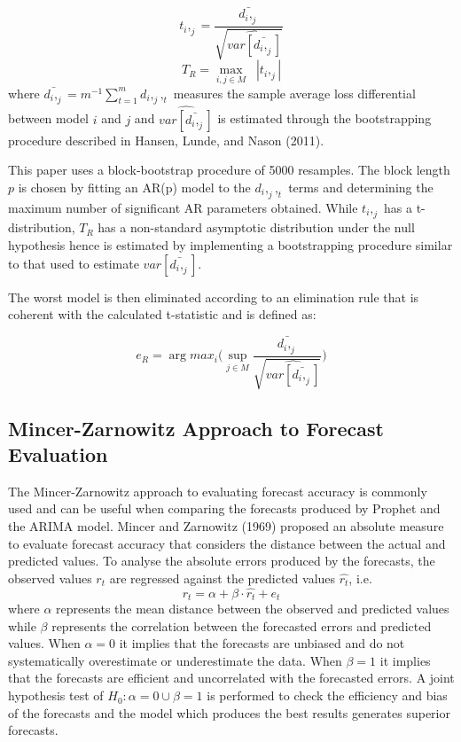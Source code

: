 \documentclass[12pt,a4paper]{article}
\numberwithin{equation}{section}
\numberwithin{figure}{section}
\numberwithin{table}{section}
\begin{document}
\[t_i,_j = \frac{\bar{d_i,_j}}{\sqrt{\hat{var[\bar{d_i,_j}]}}}\]
\vspace{1pt} \[ T_R = \max_{i,j\in M} \;\; |t_i,_j|\] where
\(\bar{d_i,_j} = m^{-1}\sum_{t=1}^{m}{d_i,_j,_t }\) measures the sample
average loss differential between model \(i\) and \(j\) and
\(\hat{var[\bar{d_i,_j}]}\) is estimated through the bootstrapping
procedure described in Hansen, Lunde, and Nason (2011).

This paper uses a block-bootstrap procedure of 5000 resamples. The block
length \(p\) is chosen by fitting an AR(p) model to the \(d_i,_j,_t\)
terms and determining the maximum number of significant AR parameters
obtained. While \(t_i,_j\) has a t-distribution, \(T_R\) has a
non-standard asymptotic distribution under the null hypothesis hence is
estimated by implementing a bootstrapping procedure similar to that used
to estimate \({var[\bar{d_i,_j}]}\).

The worst model is then eliminated according to an elimination rule that
is coherent with the calculated t-statistic and is defined as:

\[e_R = \arg max_{i}\bigg(\sup_{j\in M}\frac{\bar{d_i,_j}}{\sqrt{\hat{var[\bar{d_i,_j}]}}}\bigg)\]

\subsection{Mincer-Zarnowitz Approach to Forecast
Evaluation}\label{mincer-zarnowitz-approach-to-forecast-evaluation}

The Mincer-Zarnowitz approach to evaluating forecast accuracy is
commonly used and can be useful when comparing the forecasts produced by
Prophet and the ARIMA model. Mincer and Zarnowitz (1969) proposed an
absolute measure to evaluate forecast accuracy that considers the
distance between the actual and predicted values. To analyse the
absolute errors produced by the forecasts, the observed values \(r_t\)
are regressed against the predicted values \(\hat{r_t}\), i.e.
\[r_t = \alpha + \beta\cdot\hat{r_t} + e_t\] where \(\alpha\) represents
the mean distance between the observed and predicted values while
\(\beta\) represents the correlation between the forecasted errors and
predicted values. When \(\alpha = 0\) it implies that the forecasts are
unbiased and do not systematically overestimate or underestimate the
data. When \(\beta = 1\) it implies that the forecasts are efficient and
uncorrelated with the forecasted errors. A joint hypothesis test of
\(H_0: \alpha = 0 \cup \beta = 1\) is performed to check the efficiency
and bias of the forecasts and the model which produces the best results
generates superior forecasts.
\end{document}
